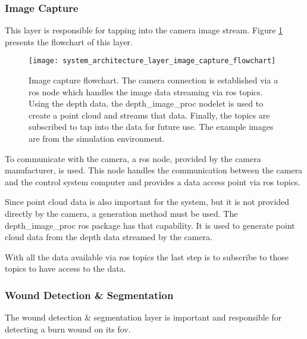 \subsubsection*{Image Capture}
\label{subsubsec:system_architectural_camera_layers_image_capture}

This layer is responsible for tapping into the camera image stream. Figure \ref{fig:system_architecture_layer_image_capture_flowchart} presents the flowchart of this layer.

\begin{figure}[htbp]
	\centering
	\texttt{[image: system\_architecture\_layer\_image\_capture\_flowchart]}
	\caption[Image capture flowchart.]{Image capture flowchart. The camera connection is established via a \gls{ros} node which handles the image data streaming via \gls{ros} topics. Using the depth data, the depth\_image\_proc nodelet is used to create a point cloud and streams that data. Finally, the topics are subscribed to tap into the data for future use.
	The example images are from the simulation environment.}
	\label{fig:system_architecture_layer_image_capture_flowchart}
\end{figure}

To communicate with the camera, a \gls{ros} node, provided by the camera manufacturer, is used. This node handles the communication between the camera and the control system computer and provides a data access point via \gls{ros} topics.

Since point cloud data is also important for the system, but it is not provided directly by the camera, a generation method must be used. The depth\_image\_proc \gls{ros} package has that capability. It is used to generate point cloud data from the depth data streamed by the camera.

With all the data available via \gls{ros} topics the last step is to subscribe to those topics to have access to the data.


\subsubsection*{Wound Detection \& Segmentation}
\label{subsubsec:system_architectural_camera_layers_wound_detection_segmentation}

The wound detection \& segmentation layer is important and responsible for detecting a burn wound on its \gls{fov}.

